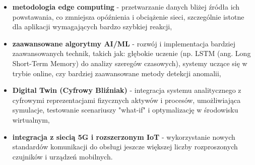 \begin{itemize}
    \item \textbf{metodologia edge computing} - przetwarzanie danych bliżej źródła ich powstawania, co zmniejsza opóźnienia i obciążenie sieci, szczególnie istotne dla aplikacji wymagających bardzo szybkiej reakcji,
    \item \textbf{zaawansowane algorytmy AI/ML} - rozwój i implementacja bardziej zaawansowanych technik, takich jak: głębokie uczenie (np. LSTM (ang. Long Short-Term Memory) do analizy szeregów czasowych), systemy uczące się w trybie online, czy bardziej zaawansowane metody detekcji anomalii,
    \item \textbf{Digital Twin (Cyfrowy Bliźniak)} - integracja systemu analitycznego z cyfrowymi reprezentacjami fizycznych aktywów i procesów, umożliwiająca symulacje, testowanie scenariuszy "what-if" i optymalizację w środowisku wirtualnym,
    \item \textbf{integracja z siecią 5G i rozszerzonym IoT} - wykorzystanie nowych standardów komunikacji do obsługi jeszcze większej liczby rozproszonych czujników i urządzeń mobilnych.
\end{itemize}